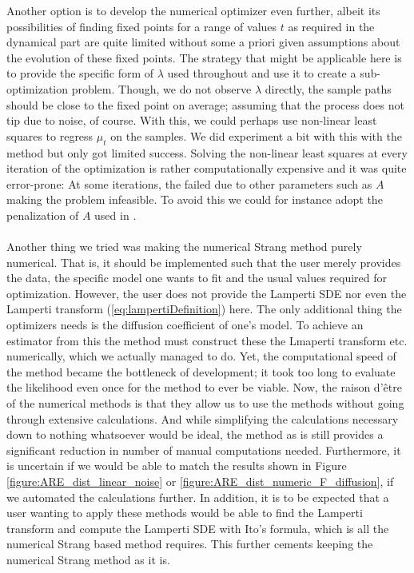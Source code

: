 Another option is to develop the numerical optimizer even further, albeit its possibilities of finding fixed points for a range of values $t$ as required in the dynamical part are quite limited without some a priori given assumptions about the evolution of these fixed points. The strategy that might be applicable here is to provide the specific form of $\lambda$ used throughout and use it to create a sub-optimization problem. Though, we do not observe $\lambda$ directly, the sample paths should be close to the fixed point on average; assuming that the process does not tip due to noise, of course. With this, we could perhaps use non-linear least squares to regress $\mu_t$ on the samples. We did experiment a bit with this with the method  but only got limited success. Solving the non-linear least squares at every iteration of the optimization is rather computationally expensive and it was quite error-prone: At some iterations, the  failed due to other parameters such as $A$ making the problem infeasible. To avoid this we could for instance adopt the penalization of $A$ used in \cite{Ditlevsen2023}.\\\\
Another thing we tried was making the numerical Strang method purely numerical. That is, it should be implemented such that the user merely provides the data, the specific model one wants to fit and the usual values required for optimization. However, the user does not provide the Lamperti SDE nor even the Lamperti transform (\ref{eq:lampertiDefinition}) here. The only additional thing the optimizers needs is the diffusion coefficient of one's model. To achieve an estimator from this the method must construct these the Lmaperti transform etc. numerically, which we actually managed to do. Yet, the computational speed of the method became the bottleneck of development; it took too long to evaluate the likelihood even once for the method to ever be viable. Now, the raison d'être of the numerical methods is that they allow us to use the methods without going through extensive calculations. And while simplifying the calculations necessary down to nothing whatsoever would be ideal, the method as is still provides a significant reduction in number of manual computations needed. Furthermore, it is uncertain if we would be able to match the results shown in Figure \ref{figure:ARE_dist_linear_noise} or \ref{figure:ARE_dist_numeric_F_diffusion}, if we automated the calculations further. In addition, it is to be expected that a user wanting to apply these methods would be able to find the Lamperti transform and compute the Lamperti SDE with Ito's formula, which is all the numerical Strang based method requires. This further cements keeping the numerical Strang method as it is.\\\\
